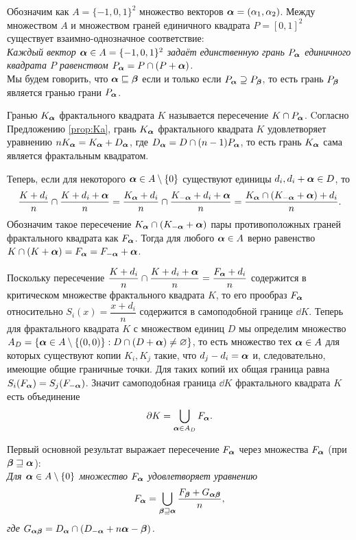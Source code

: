 Обозначим как $A=\{-1,0,1\}^2$ множество векторов ${\bm{\alpha}}=(\alpha_1,\alpha_2)$.
Между множеством $A$ и множеством граней единичного квадрата $P=[0,1]^2$ существует взаимно-однозначное соответствие:\\

{\em Каждый вектор ${\bm{\alpha}}\in A=\{-1,0,1\}^2$ задаёт единственную грань $P_{\bm{\alpha}}$ единичного квадрата $P$ равенством $P_{\bm{\alpha}}=P\cap(P+{\bm{\alpha}})$.}\\

Мы будем говорить, что ${\bm{\alpha}}\sqsubseteq{\bm{\beta}}$ если и только если $P_{\bm{\alpha}}\supseteq P_{\bm{\beta}}$, то есть грань $P_{\bm{\beta}}$ является гранью грани $P_{\bm{\alpha}}$.

Гранью $K_{\bm{\alpha}}$ фрактального квадрата $K$ называется пересечение $K\cap P_{\bm{\alpha}}$.
Cогласно Предложению \ref{prop:Ka}, грань $K_{\bm{\alpha}}$ фрактального квадрата $K$ удовлетворяет уравнению $n K_{\bm{\alpha}}=K_{\bm{\alpha}}+D_{\bm{\alpha}}$, где $D_{\bm{\alpha}}=D\cap(n-1)P_{\bm{\alpha}}$, то есть грань $K_{\bm{\alpha}}$ сама является фрактальным квадратом.

Теперь, если для некоторого ${\bm{\alpha}}\in A\setminus\{0\}$ существуют единицы $d_i,d_i+{\bm{\alpha}}\in D$, то
$$\dfrac{K+d_i}{n}\cap\dfrac{K+d_i+{\bm{\alpha}}}{n}=\dfrac{K_{\bm{\alpha}}+d_i}{n}\cap\dfrac{K_{-{\bm{\alpha}}}+d_i+{\bm{\alpha}}}{n}=\dfrac{K_{\bm{\alpha}}\cap(K_{-{\bm{\alpha}}}+{\bm{\alpha}})+d_i}{n}.$$
Обозначим такое пересечение $K_{\bm{\alpha}}\cap(K_{-{\bm{\alpha}}}+{\bm{\alpha}})$ пары противоположных граней фрактального квадрата как $F_{\bm{\alpha}}$.
Тогда для любого ${\bm{\alpha}}\in A$ верно равенство $K\cap(K+{\bm{\alpha}})=F_{\bm{\alpha}}=F_{-{\bm{\alpha}}}+{\bm{\alpha}} $.

Поскольку пересечение $\dfrac{K+d_i}{n}\cap\dfrac{K+d_i+{\bm{\alpha}}}{n}=\dfrac{F_{\bm{\alpha}}+d_i}{n}$ содержится в критическом множестве фрактального квадрата $K$, то его прообраз $F_{\bm{\alpha}}$ относительно $S_i(x)=\dfrac{x+d_i}{n}$ содержится в самоподобной границе $\dd K$.
Теперь для фрактального квадрата $K$ с множеством единиц $D$ мы определим множество 
$A_D=\{{\bm{\alpha}}\in A\setminus\{(0,0)\}: D\cap(D+{\bm{\alpha}})\neq\varnothing\}$, то есть множество тех ${\bm{\alpha}}\in A$ для которых существуют копии $K_i, K_j$ такие, что $d_j-d_i={\bm{\alpha}}$ и, следовательно, имеющие общие граничные точки. 
Для таких копий их общая граница равна $S_i(F_{\bm{\alpha}})=S_j(F_{-{\bm{\alpha}}})$. 
Значит самоподобная граница $\dd K$ фрактального квадрата $K$ есть объединение
$$\partial K=\bigcup\limits_{{\bm{\alpha}}\in A_D}F_{\bm{\alpha}}.$$

Первый основной результат выражает пересечение $F_{\bm{\alpha}}$ через множества $F_{\bm{\alpha}}$ (при ${\bm{\beta}}\sqsupseteq{\bm{\alpha}}$):\\

{\em Для ${\bm{\alpha}}\in A\setminus\{0\}$ множество $F_{\bm{\alpha}}$ удовлетворяет уравнению
$$ F_{\bm{\alpha}}=\bigcup\limits_{{\bm{\beta}}\sqsupseteq{\bm{\alpha}}} \dfrac{F_{\bm{\beta}}+G_{{\bm{\alpha}}{\bm{\beta}}}}{n},$$
где $G_{{\bm{\alpha}}{\bm{\beta}}}=D_{\bm{\alpha}}\cap(D_{-{\bm{\alpha}}}+n{\bm{\alpha}}-{\bm{\beta}})$.}\\

